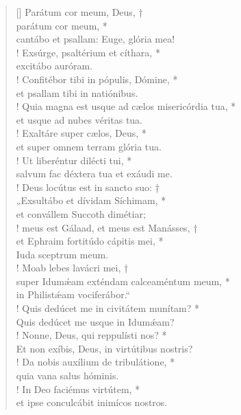 \begin{verse}[\versewidth]
Parátum cor meum, Deus, †\\
parátum cor meum, *\\
cantábo et psallam: Euge, glória mea!\\!
\vin Exsúrge, psaltérium et cíthara, *\\
\vin excitábo auróram.\\!
Confitébor tibi in pópulis, Dómine, *\\
et psallam tibi in natiónibus.\\!
\vin Quia magna est usque ad cælos misericórdia tua, *\\
\vin et usque ad nubes véritas tua.\\!
Exaltáre super cælos, Deus, *\\
et super omnem terram glória tua.\\!
\vin Ut liberéntur dilécti tui, *\\
\vin salvum fac déxtera tua et exáudi me.\\!
Deus locútus est in sancto suo: †\\
„Exsultábo et dívidam Síchimam, *\\
et convállem Succoth dimétiar;\\!
\vin meus est Gálaad, et meus est Manásses, †\\
\vin et Ephraim fortitúdo cápitis mei, *\\
\vin Iuda sceptrum meum.\\!
Moab lebes lavácri mei, †\\
super Idum\'{æ}am exténdam calceaméntum meum, *\\
in Philist\'{æ}am vociferábor.“\\!
\vin Quis dedúcet me in civitátem munítam? *\\
\vin Quis dedúcet me usque in Idum\'{æ}am?\\!
Nonne, Deus, qui reppulísti nos? *\\
Et non exíbis, Deus, in virtútibus nostris?\\!
\vin Da nobis auxílium de tribulátione, *\\
\vin quia vana salus hóminis.\\!
In Deo faciémus virtútem, *\\
et ipse conculcábit inimícos nostros.\\
\end{verse}
\vspace{1cm}



